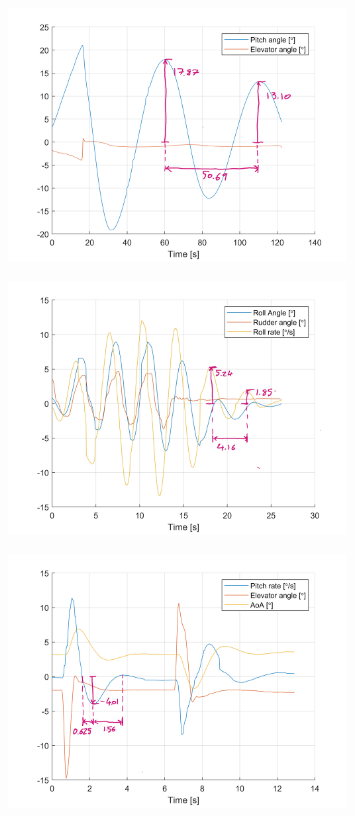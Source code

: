 \documentclass{article}
\begin{document}
\begin{figure}[H]
  \centering
  \includegraphics[width=0.8\textwidth]{figures/anPhugoid.png}
  \caption{}
  \label{fig:phugoid}
\end{figure}

\begin{figure}[H]
  \centering
  \includegraphics[width=0.8\textwidth]{figures/anDutchRoll.jpg}
  \caption{}
  \label{fig:dutchroll}
\end{figure}

\begin{figure}[H]
  \centering
  \includegraphics[width=0.8\textwidth]{figures/anSPO.png}
  \caption{}
  \label{fig:spo}
\end{figure}
\end{document}
